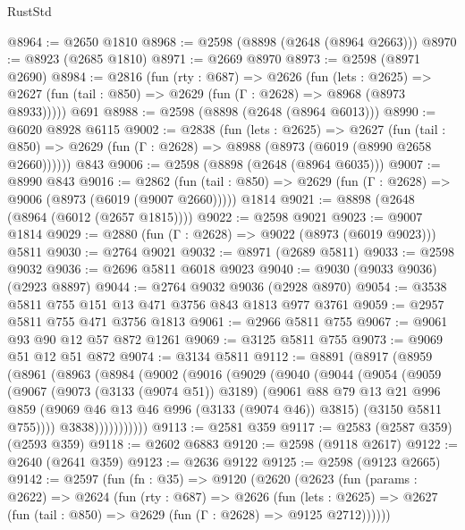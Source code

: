 \begin{lexlean}{RustStd}
\begin{coremodule}
@8964 := @2650 @1810
@8968 := @2598 (@8898 (@2648 (@8964 @2663)))
@8970 := @8923 (@2685 @1810)
@8971 := @2669 @8970
@8973 := @2598 (@8971 @2690)
@8984 := @2816
    (fun (rty : @687) =>
    @2626
      (fun (lets : @2625) =>
      @2627 (fun (tail : @850) => @2629 (fun (Γ : @2628) => @8968 (@8973 @8933)))))
    @691
@8988 := @2598 (@8898 (@2648 (@8964 @6013)))
@8990 := @6020 @8928 @6115
@9002 := @2838
    (fun (lets : @2625) =>
    @2627
      (fun (tail : @850) => @2629 (fun (Γ : @2628) => @8988 (@8973 (@6019 (@8990 @2658 @2660))))))
    @843
@9006 := @2598 (@8898 (@2648 (@8964 @6035)))
@9007 := @8990 @843
@9016 := @2862
    (fun (tail : @850) => @2629 (fun (Γ : @2628) => @9006 (@8973 (@6019 (@9007 @2660)))))
    @1814
@9021 := @8898 (@2648 (@8964 (@6012 (@2657 @1815))))
@9022 := @2598 @9021
@9023 := @9007 @1814
@9029 := @2880 (fun (Γ : @2628) => @9022 (@8973 (@6019 @9023))) @5811
@9030 := @2764 @9021
@9032 := @8971 (@2689 @5811)
@9033 := @2598 @9032
@9036 := @2696 @5811 @6018 @9023
@9040 := @9030 (@9033 @9036) (@2923 @8897)
@9044 := @2764 @9032 @9036 (@2928 @8970)
@9054 := @3538 @5811 @755 @151 @13 @471 @3756 @843 @1813 @977 @3761
@9059 := @2957 @5811 @755 @471 @3756 @1813
@9061 := @2966 @5811 @755
@9067 := @9061 @93 @90 @12 @57 @872 @1261
@9069 := @3125 @5811 @755
@9073 := @9069 @51 @12 @51 @872
@9074 := @3134 @5811
@9112 := @8891
    (@8917
      (@8959
        (@8961
          (@8963
            (@8984
              (@9002
                (@9016
                  (@9029
                    (@9040
                      (@9044
                        (@9054
                          (@9059
                            (@9067
                              (@9073 (@3133 (@9074 @51)) @3189)
                              (@9061
                                @88
                                @79
                                @13
                                @21
                                @996
                                @859
                                (@9069 @46 @13 @46 @996 (@3133 (@9074 @46)) @3815)
                                (@3150 @5811 @755))))
                          @3838)))))))))))
@9113 := @2581 @359
@9117 := @2583 (@2587 @359) (@2593 @359)
@9118 := @2602 @6883
@9120 := @2598 (@9118 @2617)
@9122 := @2640 (@2641 @359)
@9123 := @2636 @9122
@9125 := @2598 (@9123 @2665)
@9142 := @2597
    (fun (fn : @35) =>
    @9120
      (@2620
        (@2623
          (fun (params : @2622) =>
          @2624
            (fun (rty : @687) =>
            @2626
              (fun (lets : @2625) =>
              @2627 (fun (tail : @850) => @2629 (fun (Γ : @2628) => @9125 @2712))))))

\end{coremodule}
\end{lexlean}
